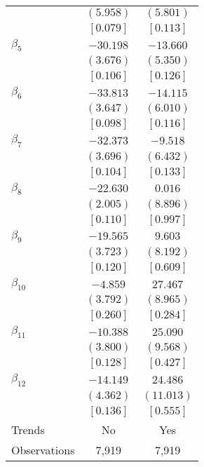 \documentclass[12pt]{article}
\begin{document}
\begin{table}[htbp]
\begin{adjustbox}{scale=0.7}
\begin{tabular}{lcc}
& $(  5.958)$ & $(  5.801)$ \\
& $[  0.079]$ & $[  0.113]$ \\
$\beta_{5}$ & $-30.198$ & $-13.660$ \\
& $(  3.676)$ & $(  5.350)$ \\
& $[  0.106]$ & $[  0.126]$ \\
$\beta_{6}$ & $-33.813$ & $-14.115$ \\
& $(  3.647)$ & $(  6.010)$ \\
& $[  0.098]$ & $[  0.116]$ \\
$\beta_{7}$ & $-32.373$ & $ -9.518$ \\
& $(  3.696)$ & $(  6.432)$ \\
& $[  0.104]$ & $[  0.133]$ \\
$\beta_{8}$ & $-22.630$ & $  0.016$ \\
& $(  2.005)$ & $(  8.896)$ \\
& $[  0.110]$ & $[  0.997]$ \\
$\beta_{9}$ & $-19.565$ & $  9.603$ \\
& $(  3.723)$ & $(  8.192)$ \\
& $[  0.120]$ & $[  0.609]$ \\
$\beta_{10}$ & $ -4.859$ & $ 27.467$ \\
& $(  3.792)$ & $(  8.965)$ \\
& $[  0.260]$ & $[  0.284]$ \\
$\beta_{11}$ & $-10.388$ & $ 25.090$ \\
& $(  3.800)$ & $(  9.568)$ \\
& $[  0.128]$ & $[  0.427]$ \\
$\beta_{12}$ & $-14.149$ & $ 24.486$ \\
& $(  4.362)$ & $(11.013)$ \\
& $[  0.136]$ & $[  0.555]$ \\
\midrule
Trends & No & Yes \\
Observations & 7,919 & 7,919 \\
\bottomrule
\end{tabular}
\end{adjustbox}
\begin{threeparttable}
\end{threeparttable}
\end{table}
\end{document}
